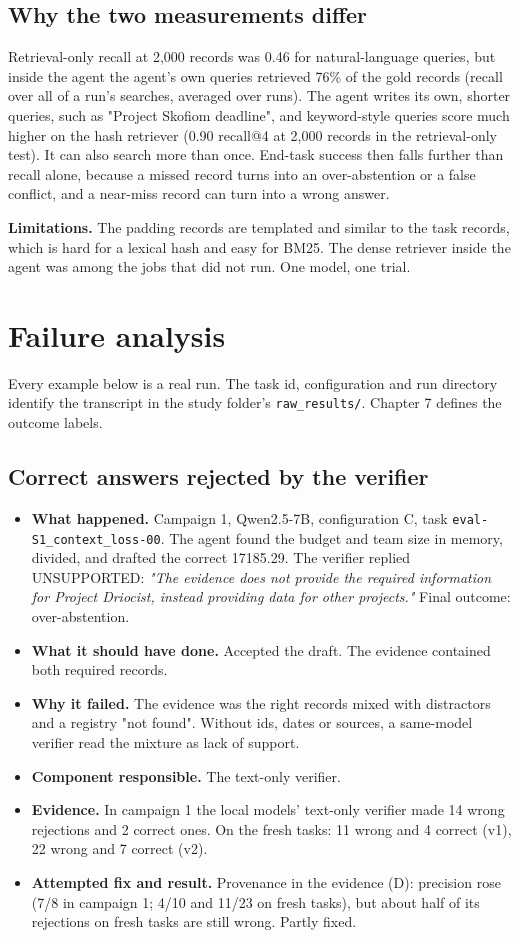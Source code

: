\documentclass[10.5pt,a4paper,oneside]{report}
\begin{document}
\section{Why the two measurements differ}
Retrieval-only recall at 2,000 records was 0.46 for natural-language queries, but inside the agent the agent's own queries retrieved 76\% of the gold records (recall over all of a run's searches, averaged over runs). The agent writes its own, shorter queries, such as "Project Skofiom deadline", and keyword-style queries score much higher on the hash retriever (0.90 recall@4 at 2,000 records in the retrieval-only test). It can also search more than once. End-task success then falls further than recall alone, because a missed record turns into an over-abstention or a false conflict, and a near-miss record can turn into a wrong answer.

\textbf{Limitations.} The padding records are templated and similar to the task records, which is hard for a lexical hash and easy for BM25. The dense retriever inside the agent was among the jobs that did not run. One model, one trial.

\clearpage
\chapter{Failure analysis}
Every example below is a real run. The task id, configuration and run directory identify the transcript in the study folder's \texttt{raw\_\allowbreak{}results/\allowbreak{}}. Chapter 7 defines the outcome labels.

\section{Correct answers rejected by the verifier}
\begin{itemize}
\item \textbf{What happened.} Campaign 1, Qwen2.5-7B, configuration C, task \texttt{eval-S1\_\allowbreak{}context\_\allowbreak{}loss-00}. The agent found the budget and team size in memory, divided, and drafted the correct 17185.29. The verifier replied UNSUPPORTED: \emph{"The evidence does not provide the required information for Project Driocist, instead providing data for other projects."} Final outcome: over-abstention.
\item \textbf{What it should have done.} Accepted the draft. The evidence contained both required records.
\item \textbf{Why it failed.} The evidence was the right records mixed with distractors and a registry "not found". Without ids, dates or sources, a same-model verifier read the mixture as lack of support.
\item \textbf{Component responsible.} The text-only verifier.
\item \textbf{Evidence.} In campaign 1 the local models' text-only verifier made 14 wrong rejections and 2 correct ones. On the fresh tasks: 11 wrong and 4 correct (v1), 22 wrong and 7 correct (v2).
\item \textbf{Attempted fix and result.} Provenance in the evidence (D): precision rose (7/8 in campaign 1; 4/10 and 11/23 on fresh tasks), but about half of its rejections on fresh tasks are still wrong. Partly fixed.
\end{itemize}
\end{document}
